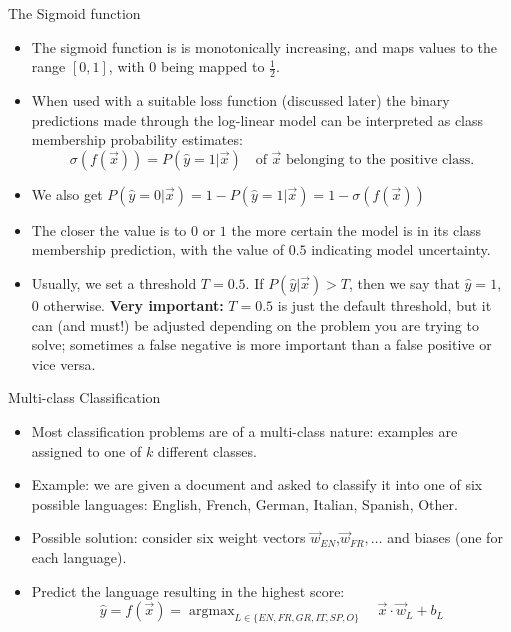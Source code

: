 \documentclass[handout]{beamer}
\begin{document}
\begin{frame}{The Sigmoid function}

\begin{scriptsize}
\begin{itemize}
\item The sigmoid function is is monotonically increasing, and maps values
to the range $[0, 1]$, with $0$ being mapped to $\frac{1}{2}$.
\item When used with a suitable loss function (discussed later) the binary predictions made through the log-linear model can be interpreted as class membership probability estimates:
\begin{equation}
 \sigma(f(\vec{x})) = P(\hat{y} = 1| \vec{x}) \quad \text{of $\vec{x}$ belonging to the positive class.}
\end{equation}
\item We also get $P(\hat{y} = 0| \vec{x}) = 1 - P(\hat{y} = 1| \vec{x}) = 1 -  \sigma(f(\vec{x}))$
\item The closer the value is to $0$ or $1$ the more certain the model is in its class membership prediction, with the value of $0.5$ indicating model uncertainty.
\item Usually, we set a threshold $T = 0.5$. If $P(\hat{y} | \vec{x}) > T$, then we say that $\hat{y} = 1$, 0 otherwise. \textbf{Very important:} $T=0.5$ is just the default threshold, but it can (and must!) be adjusted depending on the problem you are trying to solve; sometimes a false negative is more important than a false positive or vice versa.
\end{itemize}
\end{scriptsize}
\end{frame}


\begin{frame}{Multi-class Classification}

\begin{scriptsize}
\begin{itemize}
\item Most classification problems are of a multi-class nature: examples are assigned to one of $k$ different classes.
\item Example: we are given a document and asked to classify it into one of six possible languages: English, French, German, Italian, Spanish, Other.
\item Possible solution: consider six weight vectors $\vec{w}_{EN}$,$\vec{w}_{FR},\dots$ and biases (one for each language).
\item Predict the language resulting in the highest score:
\begin{equation}
 \hat{y} = f(\vec{x}) = \operatorname{argmax}_{L \in \{ EN,FR,GR,IT,SP,O \}} \quad \vec{x}\cdot \vec{w}_L+ b_{L}
\end{equation}
\end{itemize}
\end{scriptsize}
\end{frame}
\end{document}
